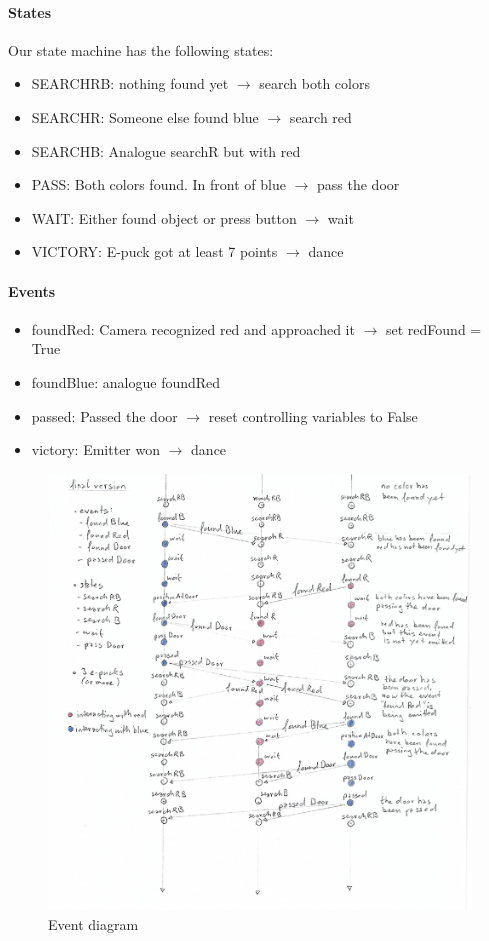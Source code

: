 \documentclass[12pt,a4paper]{article}
\begin{document}
\paragraph{States}
Our state machine has the following states:
\begin{itemize}
	\item SEARCHRB:	nothing found yet $\rightarrow$ search both colors
	\item SEARCHR:	Someone else found blue $\rightarrow$ search red
	\item SEARCHB:	Analogue searchR but with red
	\item PASS:		Both colors found. In front of blue $\rightarrow$ pass the door
	\item WAIT:		Either found object or press button $\rightarrow$ wait
	\item VICTORY:	E-puck got at least 7 points $\rightarrow$ dance
\end{itemize}

\paragraph{Events}
\begin{itemize}
	\item foundRed:	Camera recognized red and approached it $\rightarrow$ set redFound = True
	\item foundBlue:	analogue foundRed
	\item passed:	Passed the door $\rightarrow$ reset controlling variables to False  
	\item victory:	Emitter won $\rightarrow$ dance  
\end{itemize}

\begin{figure}[h!]
\begin{center}
\includegraphics[scale=0.5]{images/linediagramfinal.pdf}
\caption{Event diagram}
\label{fig:Line diagram}
\end{center}
\end{figure}
\end{document}
